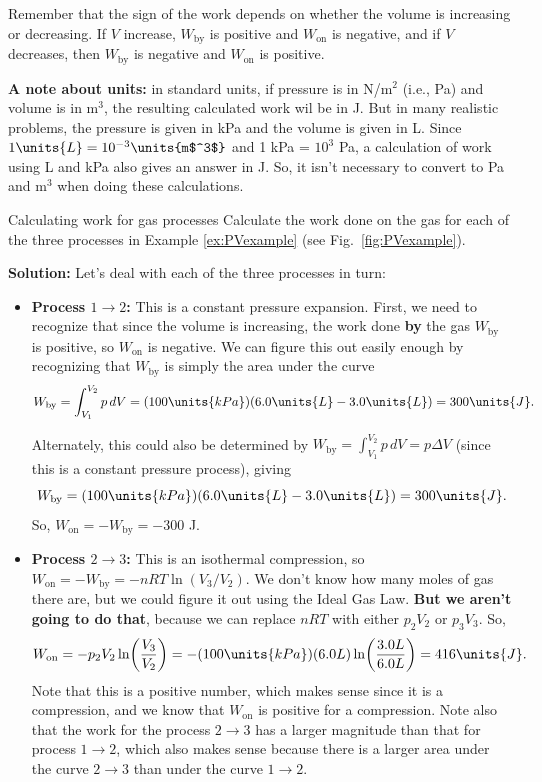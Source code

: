 Remember that the sign of the work depends on whether the volume is
increasing or decreasing. If $V$ increase, $W_\text{by}$ is positive
and $W_\text{on}$ is negative, and if $V$ decreases, then
$W_\text{by}$ is negative and $W_\text{on}$ is positive.

{\bf A note about units:} in standard units, if pressure is in N/m$^2$
(i.e., Pa) and volume is in m$^3$, the resulting calculated work wil
be in J.  But in many realistic problems, the pressure is given in kPa
and the volume is given in L.  Since $1\units{L} = 10^{-3}
\units{m$^3$}$ and 1 kPa = $10^3$ Pa, a calculation of work using L
and kPa also gives an answer in J. So, it isn't necessary to convert
to Pa and m$^3$ when doing these calculations.


\begin{example}{Calculating work for gas processes}
Calculate the work done on the gas for each of the three processes in
Example \ref{ex:PVexample} (see Fig.~\ref{fig:PVexample}).

{\bf Solution:} Let's deal with each of the three processes in turn:
\begin{itemize}
\item {\bf Process $1 \rightarrow 2$:} This is a constant pressure
  expansion.  First, we need to recognize that since the volume is
  increasing, the work done {\bf by} the gas $W_\text{by}$ is
  positive, so $W_\text{on}$ is negative.  We can figure this out
  easily enough by recognizing that $W_\text{by}$ is simply the area
  under the curve
\begin{equation}
W_\text{by} = \int_{V_1}^{V_2}p\,dV= (100\units{kPa})(6.0\units{L} -
3.0\units{L}) = 300\units{J}. \end{equation}

Alternately, this could also be determined by $W_\text{by} =
\int_{V_1}^{V_2}p\,dV = p\Delta V$ (since this is a constant pressure
process), giving
\begin{equation}
 W_\text{by} = 
(100\units{kPa})(6.0\units{L} - 3.0\units{L}) = 300\units{J}.
\end{equation}
So, $W_\text{on} = -W_\text{by} = -300$ J.

\item {\bf Process $2 \rightarrow 3$:} This is an isothermal
  compression, so $W_\text{on} = -W_\text{by} = -nRT\ln (V_3/V_2)$. We
  don't know how many moles of gas there are, but we could figure it
  out using the Ideal Gas Law.  {\bf But we aren't going to do that},
  because we can replace $nRT$ with either $p_2V_2$ or $p_3V_3$. So,
\begin{equation}
W_\text{on} = -p_2V_2\ln\biggl(\frac{V_3}{V_2}\biggr) = -(100 \units{kPa})(6.0 L)\ln \biggl(\frac{3.0 L}{6.0 L}\biggr) = 416 \units{J}.
\end{equation}
 Note that this is a positive number, which makes sense
since it is a compression, and we know that $W_\text{on}$ is positive for a
compression.  Note also that the work for the  process $2 \rightarrow 3$ 
has a larger magnitude than that for process $1 \rightarrow 2$, which also
makes sense because there is a larger area under the curve $2 \rightarrow 3$
than under the curve $1 \rightarrow 2$.


\end{itemize}
\end{example}
